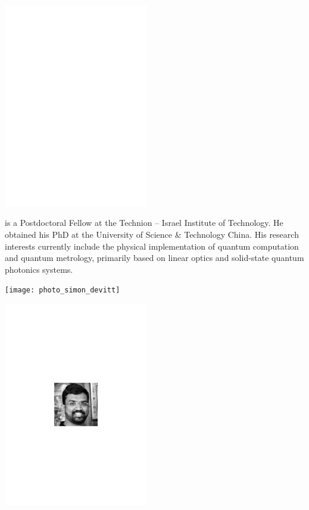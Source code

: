 \begin{center}
\includegraphics[clip=true, width=0.475\textwidth]{photo_zuen_su}
\end{center}

 is a Postdoctoral Fellow at the Technion -- Israel Institute of Technology. He obtained his PhD at the University of Science \& Technology China. His research interests currently include the physical implementation of quantum computation and quantum metrology, primarily based on linear optics and solid-state quantum photonics systems.

%
%

\begin{center}
\texttt{[image: photo\_simon\_devitt]}
\end{center}



%
%

\begin{center}
\includegraphics[clip=true, width=0.475\textwidth]{photo_rohit_ramakrishnan}
\end{center}

